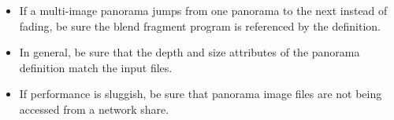 \documentclass[article,twocolumn,10pt]{memoir}
\begin{document}
\begin{Spacing}{1.1}
\begin{itemize}
\item If a multi-image panorama jumps from one panorama to the next instead of fading, be sure the blend fragment program is referenced by the definition.

\item In general, be sure that the depth and size attributes of the panorama definition match the input files.

\item If performance is sluggish, be sure that panorama image files are not being accessed from a network share.
\end{itemize}

\end{Spacing}
\end{document}
